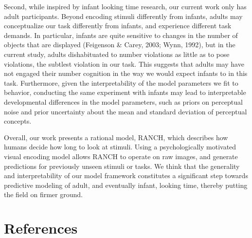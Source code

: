 \documentclass[10pt, letterpaper]{article}
\begin{document}
Second, while inspired by infant looking time research, our current work
only has adult participants. Beyond encoding stimuli differently from
infants, adults may conceptualize our task differently from infants, and
experience different task demands. In particular, infants are quite
sensitive to changes in the number of objects that are displayed
(Feigenson \& Carey, 2003; Wynn, 1992), but in the current study, adults
dishabituated to number violations as little as to pose violations, the
subtlest violation in our task. This suggests that adults may have not
engaged their number cognition in the way we would expect infants to in
this task. Furthermore, given the interpretability of the model
parameters we fit to behavior, conducting the same experiment with
infants may lead to interpretable developmental differences in the model
parameters, such as priors on perceptual noise and prior uncertainty
about the mean and standard deviation of perceptual concepts.

Overall, our work presents a rational model, RANCH, which describes how
humans decide how long to look at stimuli. Using a psychologically
motivated visual encoding model allows RANCH to operate on raw images,
and generate predictions for previously unseen stimuli or tasks. We
think that the generality and interpretability of our model framework
constitutes a significant step towards predictive modeling of adult, and
eventually infant, looking time, thereby putting the field on firmer
ground.

\hypertarget{references}{%
\section{References}\label{references}}

\setlength{\parindent}{-0.1in} 
\setlength{\leftskip}{0.125in}

\noindent
\end{document}
